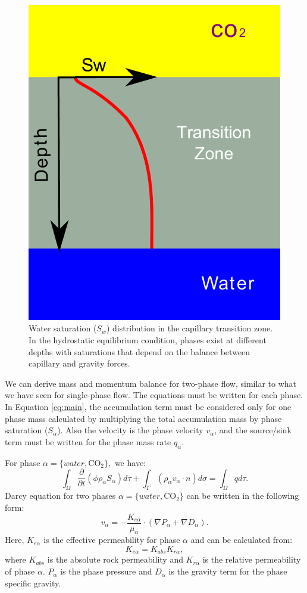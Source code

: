 \begin{figure}[thb]
 \centering{}
 \includegraphics[width=0.35\linewidth]{./figurer/pch}
 \caption{Water saturation ($S_w$) distribution in the capillary transition zone. In the hydrostatic equilibrium condition, phases exist at different depths with saturations that depend on the balance between capillary and gravity forces.}
 \label{fig:TZ}
\end{figure}



We can derive mass and momentum balance for two-phase flow, similar to what we
have seen for single-phase flow. The equations must be written for each phase.
In
Equation \ref{eq:main}, the accumulation term must be considered only for one
phase mass calculated by multiplying the total accumulation mass by phase
saturation ($ S_{\alpha}$). Also the velocity is the phase velocity
$v_{\alpha}$, and the source/sink term must be written for the phase mass rate
$q_{\alpha}$.

For phase $\alpha=\{water, \mbox{CO}_2\},$ we have:
\begin{equation}
  \int_{\Omega}\frac{\partial}{\partial t}(\phi\rho_{\alpha}
S_{\alpha})d\tau+\int_{\Gamma}(\rho_{\alpha} v_{\alpha} \cdot
n)d\sigma=\int_{\Omega}qd\tau.
  \label{eq:2phs}
\end{equation} Darcy equation for two phases $\alpha=\{water, \mbox{CO}_2\}$
can be written in the following form: 
\begin{equation}
  v_{\alpha}=-\frac{K_{e\alpha}}{\mu_{\alpha}}\cdot
(\nabla{P_{\alpha}}+\nabla{D_{\alpha}}).
  \label{eq:D2phs}
\end{equation} Here, $K_{e\alpha}$ is the effective permeability for phase
$\alpha$ and can be calculated from:
\begin{equation}
 K_{e\alpha}=K_{abs}K_{r\alpha},
 \label{eq:Ke}
\end{equation} where $K_{abs}$ is the absolute rock permeability and
$K_{r\alpha}$ is the relative permeability of phase $\alpha$. $P_{\alpha}$ is
the phase pressure and $D_{\alpha}$ is the gravity term for the phase specific
gravity.



